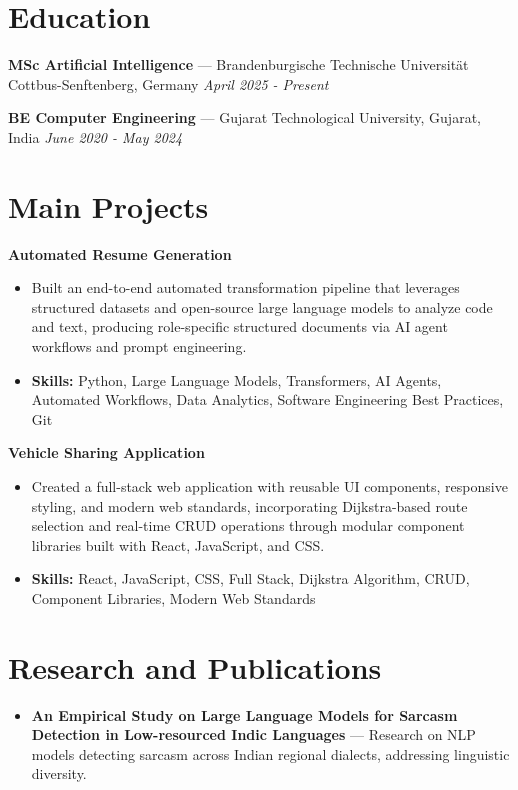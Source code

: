 \documentclass[a4paper,10pt]{article}
\begin{document}
\section*{Education}
\textbf{MSc Artificial Intelligence} — Brandenburgische Technische Universität Cottbus-Senftenberg, Germany \hfill \textit{April 2025 - Present}\par
\vspace{1.5pt}
\textbf{BE Computer Engineering} — Gujarat Technological University, Gujarat, India \hfill \textit{June 2020 - May 2024}\par

\section*{Main Projects}
\textbf{Automated Resume Generation}\par
\vspace{1pt}
\begin{itemize}
  \item Built an end-to-end automated transformation pipeline that leverages structured datasets and open-source large language models to analyze code and text, producing role-specific structured documents via AI agent workflows and prompt engineering.
  \item \textbf{Skills:} Python, Large Language Models, Transformers, AI Agents, Automated Workflows, Data Analytics, Software Engineering Best Practices, Git
\end{itemize}
\vspace{3pt}
\textbf{Vehicle Sharing Application}\par
\vspace{1pt}
\begin{itemize}
  \item Created a full-stack web application with reusable UI components, responsive styling, and modern web standards, incorporating Dijkstra-based route selection and real-time CRUD operations through modular component libraries built with React, JavaScript, and CSS.
  \item \textbf{Skills:} React, JavaScript, CSS, Full Stack, Dijkstra Algorithm, CRUD, Component Libraries, Modern Web Standards
\end{itemize}

\section*{Research and Publications}
\begin{itemize}
\item \textbf{An Empirical Study on Large Language Models for Sarcasm Detection in Low-resourced Indic Languages} — Research on NLP models detecting sarcasm across Indian regional dialects, addressing linguistic diversity.
\end{itemize}
\end{document}
